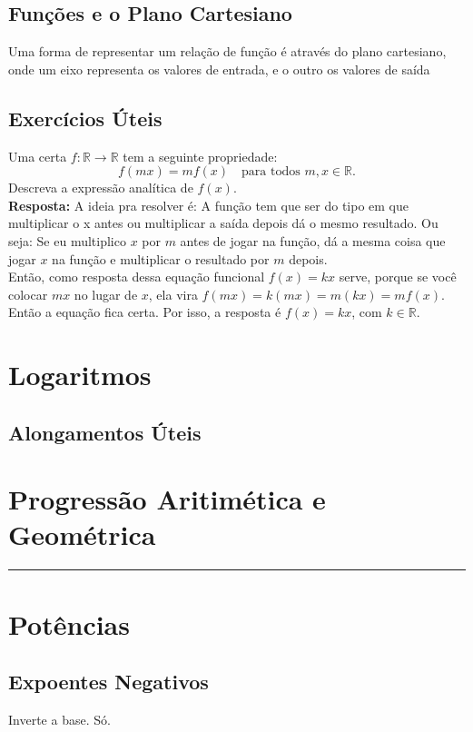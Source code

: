 \documentclass{article}
\begin{document}
\subsection{Funções e o Plano Cartesiano}
Uma forma de representar um relação de função é através do plano cartesiano, onde um eixo representa os valores de entrada, e o outro os valores de saída

\subsection{Exercícios Úteis}
Uma certa \( f : \mathbb{R} \to \mathbb{R} \) tem a seguinte propriedade:
\[
f(mx) = mf(x) \quad \text{para todos } m, x \in \mathbb{R}.
\]
Descreva a expressão analítica de \( f(x) \).
\\[5pt]
\textbf{Resposta:} A ideia pra resolver é: A função tem que ser do tipo em que multiplicar o x antes ou multiplicar a saída depois dá o mesmo resultado. Ou seja: Se eu multiplico $x$ por $m$ antes de jogar na função, dá a mesma coisa que jogar $x$ na função e multiplicar o resultado por $m$ depois.
\\[5pt]
Então, como resposta dessa equação funcional \( f(x) = kx \) serve, porque se você colocar \( mx \) no lugar de \( x \), ela vira \( f(mx) = k(mx) = m(kx) = mf(x) \). Então a equação fica certa. Por isso, a resposta é \( f(x) = kx \), com \( k \in \mathbb{R} \).

\section{Logaritmos}

\subsection{Alongamentos Úteis}

\section{Progressão Aritimética e Geométrica}
\hrule
\vspace{10pt}
\section{Potências}
\subsection{Expoentes Negativos}
Inverte a base. Só.
\end{document}
